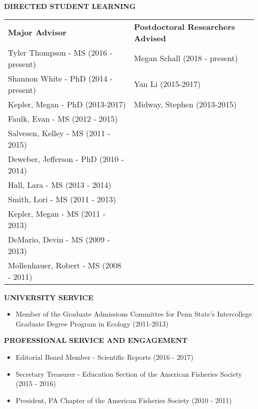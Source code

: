 \documentclass[10pt]{article}
\begin{document}
\begin{flushleft}
\begin{itemize}
\end{itemize}

\vspace{8pt}


\centerline {\bf{DIRECTED STUDENT LEARNING}}
\vspace{5pt}
\begin{tabularx}{\textwidth}{ XX }

\textbf{Major Advisor} & \textbf{Postdoctoral Researchers Advised} \\

Tyler Thompson - MS (2016 - present) & Megan Schall (2018 - present) \\
Shannon White - PhD (2014 - present)  & Yan Li (2015-2017)\\
Kepler, Megan - PhD (2013-2017) & Midway, Stephen (2013-2015)\\
Faulk, Evan - MS (2012 - 2015) &  \\
Salvesen, Kelley - MS (2011 - 2015) & \\
Deweber, Jefferson - PhD (2010 - 2014) & \\
Hall, Lara - MS (2013 - 2014) & \\
Smith, Lori - MS (2011 - 2013) & \\
Kepler, Megan - MS (2011 - 2013) & \\
DeMario, Devin - MS (2009 - 2013) & \\
Mollenhauer, Robert - MS (2008 - 2011) & \\
\end{tabularx}



\end{flushleft}

\centerline {\bf{UNIVERSITY SERVICE}}
\vspace{5pt}
\begin{itemize}
\item Member of the Graduate Admissions Committee for Penn State's Intercollege Graduate Degree Program in Ecology (2011-2013) 
\end{itemize}

\centerline {\bf{PROFESSIONAL SERVICE AND ENGAGEMENT}}
\vspace{5pt}
\begin{itemize}
\item Editorial Board Member - Scientific Reports (2016 - 2017)
\item Secretary Treasurer - Education Section of the American Fisheries Society (2015 - 2016)
\item President, PA Chapter of the American Fisheries Society (2010 - 2011)
\end{itemize}
\end{document}
